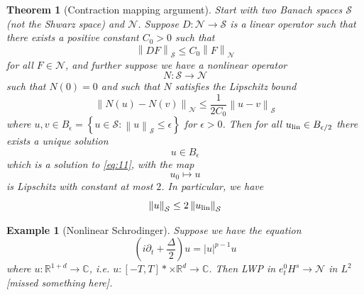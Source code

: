 \documentclass{article}
\def\purple{\color{Purple}}
\newcommand{\pnote}[1]{{\purple [#1]}} %
\newtheorem{theorem}{Theorem}
\newtheorem{example}{Example}
\def\R{\mathbb{R}} %
\newcommand\norm[1]{\left\lVert#1\right\rVert}
\begin{document}
\begin{theorem}[Contraction mapping argument]
  Start with two Banach spaces $\mathcal{S}$ (not the Shwarz space) and
  $\mathcal{N}$. Suppose $D:\mathcal{N}\to \mathcal{S}$  is a linear operator
  such that there exists a positive constant $C_{0}>0$ such that
  \begin{equation*}
    \norm{DF}_{\mathcal{S}} \leq C_{0} \norm{F}_{\mathcal{N}}
  \end{equation*}
  for all $F\in \mathcal{N}$, and further suppose we have a nonlinear operator
  \begin{equation*}
    N:\mathcal{S} \to \mathcal{N}
  \end{equation*}
  such that $N(0)=0$ and such that $N$ satisfies the Lipschitz bound
  \begin{equation*}
    \norm{N(u)- N(v)}_{\mathcal{N}} \leq  \frac{1}{2C_{0}}\norm{u-v}_{\mathcal{S}}
  \end{equation*}
  where $u,v\in B_{\epsilon}= \left\{ u\in \mathcal{S}:\norm{u}_{\mathcal{S}}\leq \epsilon\right\}$ for $\epsilon>0$. Then
for all 
$u_{\rm lin}\in B_{\epsilon/2}$ there exists a unique solution
\begin{equation*}
  u\in B_{\epsilon}
\end{equation*}
which is a solution to \cref{eq:11}, with the map
\begin{equation*}
  u_{0} \mapsto u
\end{equation*}
is Lipschitz with constant at most $2$. In particular, we have
\begin{equation*}
  \norm{u}_{\mathcal{S}}\leq 2 \norm{u_{\rm lin}}_{\mathcal{S}}
\end{equation*}
\end{theorem}
\begin{example}[Nonlinear Schrodinger]
  Suppose we have the equation
  \begin{equation*}
    \left(i\partial_{t}+\frac{\Delta}{2}\right)u = |u|^{p-1}u
  \end{equation*}
  where $u:\R^{1+d}\to \mathbb{C}$, i.e. $u:[-T,T]*\times \R^{d}\to \mathbb{C}$.
  Then LWP in $e_{t}^{0}H^{s}\to \mathcal{N}$ in $L^{2}$ \pnote{missed something
  here}.
\end{example}
\end{document}
